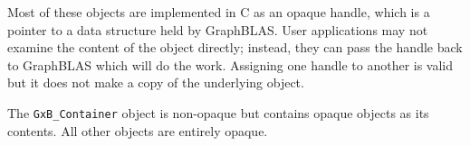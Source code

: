 Most of these objects are implemented in C as an opaque handle, which is a
pointer to a data structure held by GraphBLAS.  User applications may not
examine the content of the object directly; instead, they can pass the handle
back to GraphBLAS which will do the work.  Assigning one handle to another
is valid but it does not make a copy of the underlying object.

The \verb'GxB_Container' object is non-opaque but contains opaque objects
as its contents.  All other objects are entirely opaque.

















